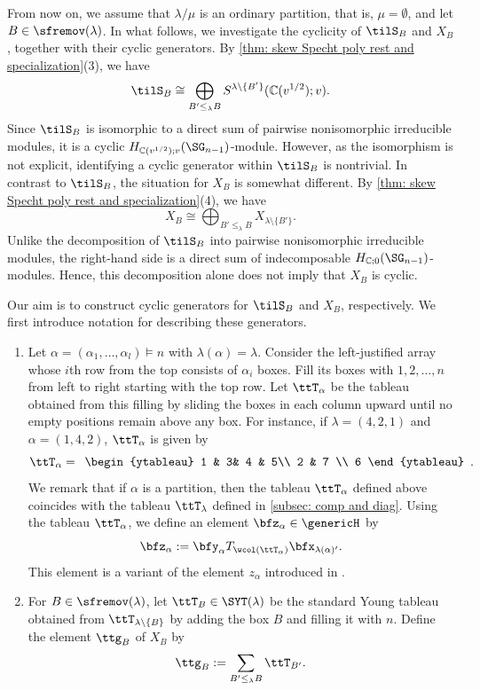 \documentclass[12pt, reqno]{amsart}
\theoremstyle{plain}
\theoremstyle{definition}
\numberwithin{equation}{section}
\numberwithin{figure}{section}
\numberwithin{table}{section}
\def\C{\mathbb C}
\begin{document}
From now on, we assume that $\lambda/\mu$ is an ordinary partition, that is, $\mu=\emptyset$, and let $B\in\sfremov(\lambda)$. 
In what follows, we investigate the cyclicity of $\tilS_B$ and $X_B$, together with their cyclic generators.
By \cref{thm: skew Specht poly rest and specialization}(3), we have
\[
\tilS_{B}  \cong \bigoplus_{B' \leq_{\lambda} B} S^{\lambda \setminus \{B'\}}(\C(v^{1/2});v).
\]
Since 
$\tilS_{B}$ is isomorphic to a direct sum of pairwise nonisomorphic irreducible modules, it is a cyclic $H_{\C(v^{1/2});v}(\SG_{n-1})$-module.
However, as the isomorphism is not explicit, identifying a cyclic generator within $\tilS_{B}$ is nontrivial.
In contrast to $\tilS_B$, the situation for $X_B$ is somewhat different. By \cref{thm: skew Specht poly rest and specialization}(4), we have
\[
X_B \cong \bigoplus_{B' \leq_\lambda B} X_{\lambda\setminus\{B'\}}.
\]
Unlike the decomposition of $\tilS_B$ into pairwise nonisomorphic irreducible modules, the right-hand side is a direct sum of indecomposable $H_{\C;0}(\SG_{n-1})$-modules. Hence, this decomposition alone does not imply that 
$X_B$ is cyclic. 

Our aim is to construct cyclic generators for $\tilS_B$ and $X_B$, respectively.
We first introduce notation for describing these generators.


\begin{enumerate}[label = {\rm (\roman*)}, leftmargin = 4ex, itemsep = 1ex]
\item 
Let $\alpha=(\alpha_1,\ldots,\alpha_l)\models n$ with
$\lambda(\alpha)=\lambda$.
Consider the left-justified array whose $i$th row from the top consists of $\alpha_i$ boxes.
Fill its boxes with $1,2,\ldots,n$ from left to right starting with the top row.
Let $\ttT_\alpha$ be the tableau obtained from this filling by sliding the boxes in each column upward until no empty positions remain above any box.
For instance, if $\lambda = (4,2,1)$ and $\alpha = (1,4,2)$, $\ttT_\alpha$ is given by
\[
\ttT_\alpha = \begin{array}{l}
\begin{ytableau}
    1 & 3& 4 & 5\\
    2 & 7 \\
    6
\end{ytableau}
\end{array}.
\]
We remark that if $\alpha$ is a partition, then the tableau $\ttT_\alpha$ defined above coincides with the tableau $\ttT_\lambda$ defined in \cref{subsec: comp and diag}.
Using the tableau $\ttT_\alpha$, we define an element $\bfz_\alpha \in \genericH$ by
\[
\bfz_\alpha := \bfy_\alpha T_{\wcol(\ttT_\alpha)}\bfx_{\lambda(\alpha)'}.
\]
This element is a variant of the element $z_\alpha$ introduced in \cite[Section 4]{86DJ}.


\item
For $B \in \sfremov(\lambda)$, let $\ttT_{B} \in \SYT(\lambda)$ be the standard Young tableau obtained from $\ttT_{\lambda\setminus\{B\}}$ by adding the box $B$ and filling it with $n$.
Define the element $\ttg_{B}$ of $X_{B}$ by 
\[
\ttg_{B} := \sum_{B' \leq_{\lambda} B} \ttT_{B'}.
\]
\end{enumerate}
\end{document}
